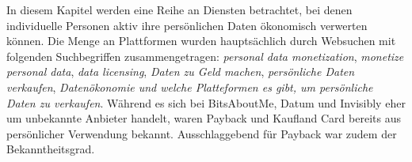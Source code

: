 In diesem Kapitel werden eine Reihe an Diensten betrachtet, bei denen individuelle Personen aktiv ihre persönlichen Daten ökonomisch verwerten können. Die Menge an Plattformen wurden hauptsächlich durch Websuchen mit folgenden Suchbegriffen zusammengetragen: \textit{personal data monetization}, \textit{monetize personal data}, \textit{data licensing}, \textit{Daten zu Geld machen}, \textit{persönliche Daten verkaufen}, \textit{Datenökonomie und welche Platteformen es gibt, um persönliche Daten zu verkaufen}. Während es sich bei BitsAboutMe, Datum und Invisibly eher um unbekannte Anbieter handelt, waren Payback und Kaufland Card bereits aus persönlicher Verwendung bekannt. Ausschlaggebend für Payback war zudem der Bekanntheitsgrad.
